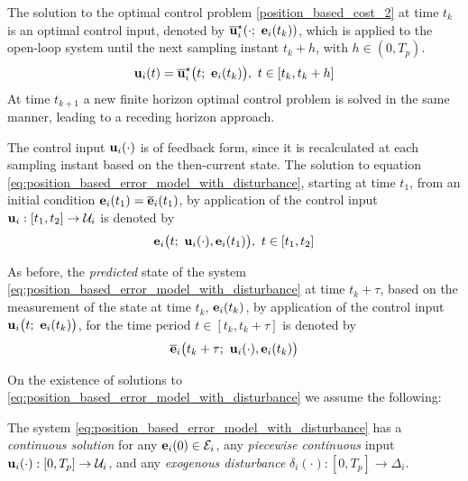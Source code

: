 The solution to the optimal control problem \eqref{position_based_cost_2}
at time $t_k$ is an optimal control input, denoted by
$\overline{\bm{\mathbf{u}}}_i^{\star}(\cdot;\ \bm{\mathbf{e}}_i(t_k))$, which
is applied to the open-loop system until the next sampling instant $t_k + h$,
with $h \in (0,T_p)$.
\begin{align}
  \bm{\mathbf{u}}_i(t) = \overline{\bm{\mathbf{u}}}_i^{\star}\big(t;\ \bm{\mathbf{e}}_i(t_k)\big),\  t \in [t_k, t_k + h]
 \label{eq:position_based_optimal_u_2}
\end{align}
At time $t_{k+1}$ a new finite horizon optimal control problem is solved in the
same manner, leading to a receding horizon approach.

The control input $\bm{\mathbf{u}}_i(\cdot)$ is of feedback form,
since it is recalculated at each sampling instant based on the then-current
state. The solution to equation \eqref{eq:position_based_error_model_with_disturbance}, starting at time
$t_1$, from an initial condition $\bm{\mathbf{e}}_i(t_1) = \overline{\bm{\mathbf{e}}}_i(t_1)$,
by application of the control input $\bm{\mathbf{u}}_i : [t_1, t_2] \to \mathcal{U}_i$
is denoted by
\begin{align}
  \bm{\mathbf{e}}_i\big(t;\ \bm{\mathbf{u}}_i(\cdot), \bm{\mathbf{e}}_i(t_1)\big),\ t \in [t_1, t_2]
\end{align}

As before, the \textit{predicted} state of the system
\eqref{eq:position_based_error_model_with_disturbance}
at time $t_k + \tau$, based on the measurement of the state at time
$t_k$, $\bm{\mathbf{e}}_i(t_k)$, by application of the control input
$\bm{\mathbf{u}}_i\big(t;\ \bm{\mathbf{e}}_i(t_k)\big)$, for the time period $t \in [t_k, t_k + \tau]$
is denoted by
\begin{align}
  \overline{\bm{\mathbf{e}}}_i\big(t_k + \tau;\ \bm{\mathbf{u}}_i(\cdot), \bm{\mathbf{e}}_i(t_k)\big) \label{eq:position_based_predicted_error_0_2}
\end{align}

On the existence of solutions to
\eqref{eq:position_based_error_model_with_disturbance} we assume the following:
\begin{bw_box}
\begin{assumption}
  \label{ass:existence_of_solutions_with_disturbance}

  The system \eqref{eq:position_based_error_model_with_disturbance} has a
  \textit{continuous solution} for any $\bm{\mathbf{e}}_i(0) \in \mathcal{E}_i$,
  any \textit{piecewise continuous} input
  $\bm{\mathbf{u}}_i(\cdot) :[0,T_p] \to \mathcal{U}_i$, and any
  \textit{exogenous disturbance} $\delta_i(\cdot) : [0,T_p] \to \Delta_i$.
\end{assumption}
\end{bw_box}


